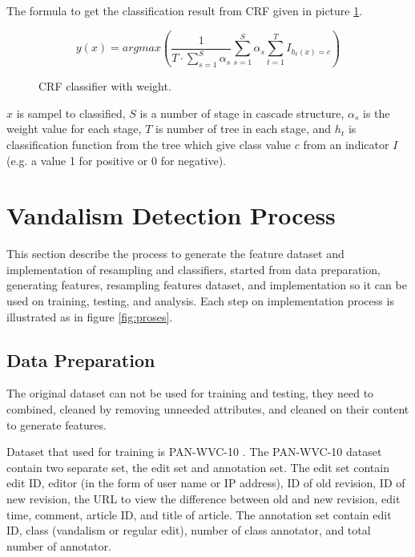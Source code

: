 \documentclass[conference,compsoc,a4paper,twocolumn,final]{IEEEtran}
\begin{document}
The formula to get the classification result from CRF given in picture
\ref{form:crf}.

\begin{figure}[h]
\[
	y(x) = argmax \left(
			\frac{1}{T \cdot \sum^{S}_{s=1} \alpha_{s} }
			\sum\limits_{s=1}^{S} \alpha_{s}
			\sum\limits^{T}_{t=1} I_{h_{t} (x) = c}
		\right)
\]
\caption{CRF classifier with weight.}
\label{form:crf}
\end{figure}

$x$ is sampel to classified,
$S$ is a number of stage in cascade structure,
$\alpha_{s}$ is the weight value for each stage,
$T$ is number of tree in each stage, and
$h_{t}$ is classification function from the tree which give class value $c$
from an indicator $I$ (e.g. a value 1 for positive or 0 for negative).


\section{Vandalism Detection Process}
\label{section:research_methodology}

This section describe the process to generate the feature dataset and
implementation of resampling and classifiers, started from data preparation,
generating features, resampling features dataset, and implementation so it can
be used on training, testing, and analysis.
Each step on implementation process is illustrated as in figure
\ref{fig:proses}.



\subsection{Data Preparation}
\label{subsection:data_preparation}

The original dataset can not be used for training and testing, they need to
combined, cleaned by removing unneeded attributes, and cleaned on their content
to generate features.

Dataset that used for training is PAN-WVC-10 \cite{potthast2008automatic}.
The PAN-WVC-10 dataset contain two separate set, the edit set and
annotation set.
The edit set contain edit ID, editor (in the form of user name or IP address),
ID of old revision, ID of new revision, the URL to view the difference between
old and new revision, edit time, comment, article ID, and title of article.
The annotation set contain edit ID, class (vandalism or regular edit), number
of class annotator, and total number of annotator.
\end{document}
